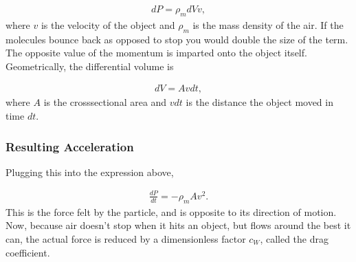 \documentclass[letterpaper,10pt,english]{sphinxmanual}
\begin{document}
\begin{equation*}
\begin{split}
\begin{equation}
dP=\rho_m dV v,
\label{_auto1} \tag{1}
\end{equation}
\end{split}
\end{equation*}
where \(v\) is the velocity of the object and \(\rho_m\) is the mass
density of the air. If the molecules bounce back as opposed to stop
you would double the size of the term. The opposite value of the
momentum is imparted onto the object itself. Geometrically, the
differential volume is




\begin{equation*}
\begin{split}
\begin{equation}
dV=Avdt,
\label{_auto2} \tag{2}
\end{equation}
\end{split}
\end{equation*}
where \(A\) is the cross\sphinxhyphen{}sectional area and \(vdt\) is the distance the
object moved in time \(dt\).


\subsubsection{Resulting Acceleration}
\label{\detokenize{chapter3:resulting-acceleration}}
Plugging this into the expression above,




\begin{equation*}
\begin{split}
\begin{equation}
\frac{dP}{dt}=-\rho_m A v^2.
\label{_auto3} \tag{3}
\end{equation}
\end{split}
\end{equation*}
This is the force felt by the particle, and is opposite to its
direction of motion. Now, because air doesn’t stop when it hits an
object, but flows around the best it can, the actual force is reduced
by a dimensionless factor \(c_W\), called the drag coefficient.
\end{document}
